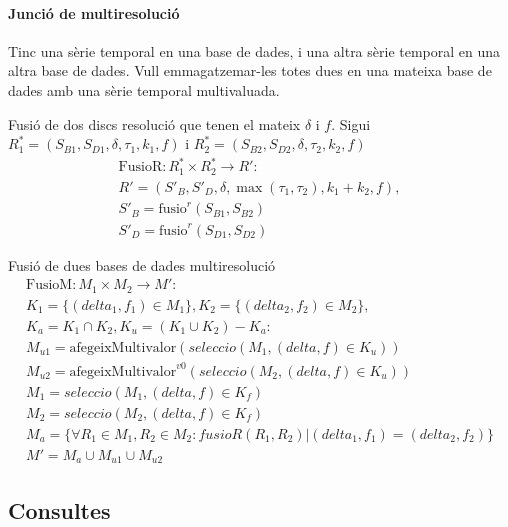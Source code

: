 \paragraph{Junció de multiresolució}


Tinc una sèrie temporal en una base de dades, i una altra sèrie temporal en una altra base de dades. Vull emmagatzemar-les totes dues en una mateixa base de dades amb una sèrie temporal multivaluada.


Fusió de dos discs resolució que tenen el mateix $\delta$ i $f$.
Sigui $R_1^*=(S_{B1},S_{D1},\delta,\tau_1,k_1,f)$ i
$R_2^*=(S_{B2},S_{D2},\delta,\tau_2,k_2,f)$
  \begin{gather*}
    \text{FusioR}: R_1^* \times R_2^* \longrightarrow R': \\
    R' = (S'_B,S'_D,\delta,\max(\tau_1,\tau_2),k_1+k_2,f), \\
    S'_B = \text{fusio}^r(S_{B1},S_{B2})\\
    S'_D = \text{fusio}^r(S_{D1},S_{D2})
\end{gather*}


Fusió de dues bases de dades multiresolució
\begin{gather*}
    \text{FusioM}: M_1 \times M_2 \longrightarrow M': \\
    K_1 = \{(delta_1,f_1) \in M_1\},K_2 = \{(delta_2,f_2) \in M_2\}, \\
    K_a = K_1 \cap K_2, K_u =  (K_1 \cup K_2) - K_a : \\
    M_{u1} =\text{afegeixMultivalor}(seleccio(M_1, (delta,f) \in K_u))\\
    M_{u2} =\text{afegeixMultivalor}^{v0} (seleccio(M_2, (delta,f) \in K_u))\\
    M_1 = seleccio(M_1, (delta,f) \in K_f) \\
    M_2 = seleccio(M_2, (delta,f) \in K_f) \\
    M_a = \{\forall R_1\in M_1,R_2\in M_2: fusioR(R_1,R_2) |
       (delta_1,f_1) = (delta_2,f_2) \} \\
    M' =  M_{a} \cup  M_{u1}  \cup  M_{u2}     
\end{gather*}






\subsection{Consultes}



